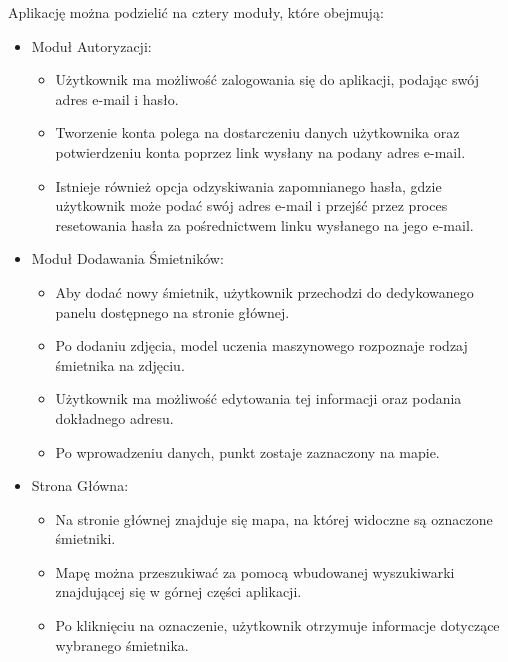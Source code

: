 \documentclass[12pt, a4paper, twoside, openany]{book}
\begin{document}
Aplikację można podzielić na cztery moduły, które obejmują:

\begin{itemize}
    \item Moduł Autoryzacji:
        \begin{itemize}
            \item Użytkownik ma możliwość zalogowania się do aplikacji, podając swój adres e-mail i hasło.
            \item Tworzenie konta polega na dostarczeniu danych użytkownika oraz potwierdzeniu konta poprzez link wysłany na podany adres e-mail.
            \item Istnieje również opcja odzyskiwania zapomnianego hasła, gdzie użytkownik może podać swój adres e-mail i przejść przez proces resetowania hasła za pośrednictwem linku wysłanego na jego e-mail.
        \end{itemize}
\end{itemize}

\begin{itemize}
    \item Moduł Dodawania Śmietników:
        \begin{itemize}
            \item Aby dodać nowy śmietnik, użytkownik przechodzi do dedykowanego panelu dostępnego na stronie głównej.
            \item Po dodaniu zdjęcia, model uczenia maszynowego rozpoznaje rodzaj śmietnika na zdjęciu.
            \item Użytkownik ma możliwość edytowania tej informacji oraz podania dokładnego adresu.
            \item Po wprowadzeniu danych, punkt zostaje zaznaczony na mapie.
        \end{itemize}
\end{itemize}

\begin{itemize}
    \item Strona Główna:
        \begin{itemize}
            \item Na stronie głównej znajduje się mapa, na której widoczne są oznaczone śmietniki.
            \item Mapę można przeszukiwać za pomocą wbudowanej wyszukiwarki znajdującej się w górnej części aplikacji.
            \item Po kliknięciu na oznaczenie, użytkownik otrzymuje informacje dotyczące wybranego śmietnika.
        \end{itemize}
\end{itemize}
\end{document}
